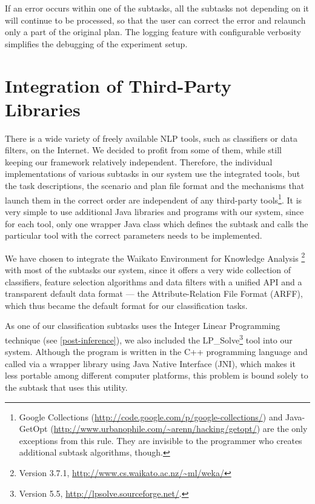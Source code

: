 \documentclass[12pt,notitlepage]{report}
\begin{document}
If an error occurs within one of the subtasks, all the subtasks not depending on it will continue to be processed, so that the user can correct the error and relaunch only a part of the original plan. The logging feature with configurable verbosity simplifies the debugging of the experiment setup.

\section{Integration of Third-Party Libraries}\label{weka}

There is a wide variety of freely available NLP tools, such as classifiers or data filters, on the Internet. We decided to profit from some of them, while still keeping our framework relatively independent. Therefore, the individual implementations of various subtasks in our system use the integrated tools, but the task descriptions, the scenario and plan file format and the mechanisms that launch them in the correct order are independent of any third-party tools\footnote{Google Collections (\url{http://code.google.com/p/google-collections/}) and Java-GetOpt (\url{http://www.urbanophile.com/\~arenn/hacking/getopt/}) are the only exceptions from this rule. They are invisible to the programmer who creates additional subtask algorithms, though.}. It is very simple to use additional Java libraries and programs with our system, since for each tool, only one wrapper Java class which defines the subtask and calls the particular tool with the correct parameters needs to be implemented.

We have chosen to integrate the Waikato Environment for Knowledge Analysis \citep[WEKA][]{garner95}\footnote{Version 3.7.1, \url{http://www.cs.waikato.ac.nz/~ml/weka/}} with most of the subtasks our system, since it offers a very wide collection of classifiers, feature selection algorithms and data filters with a unified API and a transparent default data format --- the Attribute-Relation File Format (ARFF), which thus became the default format for our classification tasks.

As one of our classification subtasks uses the Integer Linear Programming technique (see \ref{post-inference}), we also included the LP\_Solve\footnote{Version 5.5, \url{http://lpsolve.sourceforge.net/}.} tool into our system. Although the program is written in the C++ programming language and called via a wrapper library using Java Native Interface (JNI), which makes it less portable among different computer platforms, this problem is bound solely to the subtask that uses this utility.
\end{document}
